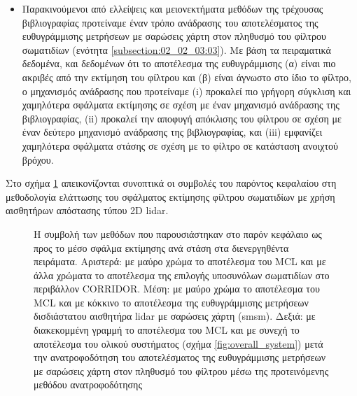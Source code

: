 \begin{itemize}
  \item Παρακινούμενοι από ελλείψεις και μειονεκτήματα μεθόδων της τρέχουσας
        βιβλιογραφίας προτείναμε έναν τρόπο ανάδρασης του αποτελέσματος της
        ευθυγράμμισης μετρήσεων με σαρώσεις χάρτη στον πληθυσμό του φίλτρου
        σωματιδίων (ενότητα \ref{subsection:02_02_03:03}). Με βάση τα
        πειραματικά δεδομένα, και δεδομένων ότι το αποτέλεσμα της ευθυγράμμισης
        (α) είναι πιο ακριβές από την εκτίμηση του φίλτρου και (β) είναι
        άγνωστο στο ίδιο το φίλτρο, ο μηχανισμός ανάδρασης που προτείναμε (i)
        προκαλεί πιο γρήγορη σύγκλιση και χαμηλότερα σφάλματα εκτίμησης σε
        σχέση με έναν μηχανισμό ανάδρασης της βιβλιογραφίας, (ii) προκαλεί την
        αποφυγή απόκλισης του φίλτρου σε σχέση με έναν δεύτερο μηχανισμό
        ανάδρασης της βιβλιογραφίας, και (iii) εμφανίζει χαμηλότερα σφάλματα
        στάσης σε σχέση με το φίλτρο σε κατάσταση ανοιχτού βρόχου.
\end{itemize}

Στο σχήμα \ref{fig:02_02_05:01} απεικονίζονται συνοπτικά οι συμβολές του
παρόντος κεφαλαίου στη μεθοδολογία ελάττωσης του σφάλματος εκτίμησης φίλτρου
σωματιδίων με χρήση αισθητήρων απόστασης τύπου 2D lidar.

\begin{figure}[h]
  \vspace{1.5cm}
  \hspace{-1.5cm}
  
  \vspace{1cm}
  \caption{\small Η συμβολή των μεθόδων που παρουσιάστηκαν στο παρόν κεφάλαιο
           ως προς το μέσο σφάλμα εκτίμησης ανά στάση στα διενεργηθέντα
           πειράματα. Αριστερά: με μαύρο χρώμα το αποτέλεσμα του MCL και με άλλα
           χρώματα το αποτέλεσμα της επιλογής υποσυνόλων σωματιδίων στο
           περιβάλλον CORRIDOR. Μέση: με μαύρο χρώμα το αποτέλεσμα του MCL και
           με κόκκινο το αποτέλεσμα της ευθυγράμμισης μετρήσεων δισδιάστατου
           αισθητήρα lidar με σαρώσεις χάρτη (smsm). Δεξιά: με διακεκομμένη
           γραμμή το αποτέλεσμα του MCL και με συνεχή το αποτέλεσμα του ολικού
           συστήματος (σχήμα \ref{fig:overall_system}) μετά την ανατροφοδότηση
           του αποτελέσματος της ευθυγράμμισης μετρήσεων με σαρώσεις χάρτη
           στον πληθυσμό του φίλτρου μέσω της προτεινόμενης μεθόδου
           ανατροφοδότησης}
  \label{fig:02_02_05:01}
\end{figure}


